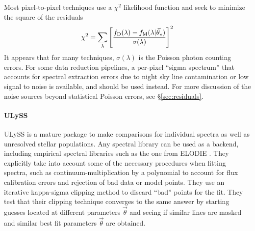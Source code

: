 \documentclass[preprint]{aastex} %
\newcommand{\vt}{\vec{\theta}}
\newcommand{\vstar}{\vt_{\star}}
\newcommand{\fM}{f_{\rm M}}
\newcommand{\fD}{f_{\rm D}}
\begin{document}
Most pixel-to-pixel techniques use a $\chi^2$ likelihood function and seek to minimize the square of the residuals
\begin{equation}
  \chi^2 = \sum_\lambda \left [\frac{ \fD(\lambda) - \fM(\lambda | \vstar) }{\sigma(\lambda)} \right ]^2
\end{equation}
It appears that for many techniques, $\sigma(\lambda)$ is the Poisson photon counting errors. For some data reduction pipelines, a per-pixel ``sigma spectrum'' that accounts for spectral extraction errors due to night sky line contamination or low signal to noise is available, and should be used instead. For more discussion of the noise sources beyond statistical Poisson errors, see \S\ref{sec:residuals}.

\paragraph{ULySS} ULySS \citep{kpb+09} is a mature package to make comparisons for individual spectra as well as unresolved stellar populations. Any spectral library can be used as a backend, including empirical spectral libraries such as the one from ELODIE \citep{psk+07}. They explicitly take into account some of the necessary procedures when fitting spectra, such as continuum-multiplication by a polynomial to account for flux calibration errors and rejection of bad data or model points. They use an iterative kappa-sigma clipping method to discard ``bad'' points for the fit. They test that their clipping technique converges to the same answer by starting guesses located at different parameters $\vt$ and seeing if similar lines are masked and similar best fit parameters $\vt$ are obtained.
\end{document}

